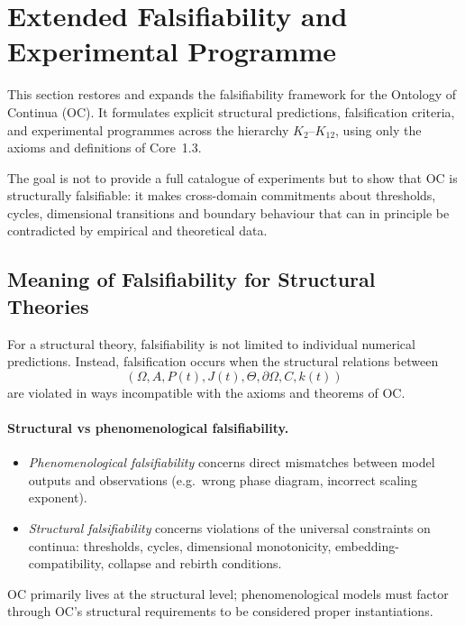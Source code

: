 
\section{Extended Falsifiability and Experimental Programme}
\label{sec:falsifiability-extended}

This section restores and expands the falsifiability framework for the
Ontology of Continua (OC). It formulates explicit structural predictions,
falsification criteria, and experimental programmes across the hierarchy
\(K_2\)–\(K_{12}\), using only the axioms and definitions of Core~1.3.

The goal is not to provide a full catalogue of experiments but to show that
OC is structurally falsifiable: it makes cross-domain commitments about
thresholds, cycles, dimensional transitions and boundary behaviour that can
in principle be contradicted by empirical and theoretical data.

\subsection{Meaning of Falsifiability for Structural Theories}

For a structural theory, falsifiability is not limited to individual
numerical predictions.  Instead, falsification occurs when the structural
relations between
\[
  (\Omega, A, P(t), J(t),
   \Theta, \partial\Omega, C, k(t))
\]
are violated in ways incompatible with the axioms and theorems of OC.

\paragraph{Structural vs phenomenological falsifiability.}
\begin{itemize}
  \item \emph{Phenomenological falsifiability} concerns direct mismatches
        between model outputs and observations (e.g.\ wrong phase diagram,
        incorrect scaling exponent).
  \item \emph{Structural falsifiability} concerns violations of the universal
        constraints on continua: thresholds, cycles, dimensional monotonicity,
        embedding-compatibility, collapse and rebirth conditions.
\end{itemize}
OC primarily lives at the structural level; phenomenological models must
factor through OC’s structural requirements to be considered proper
instantiations.

